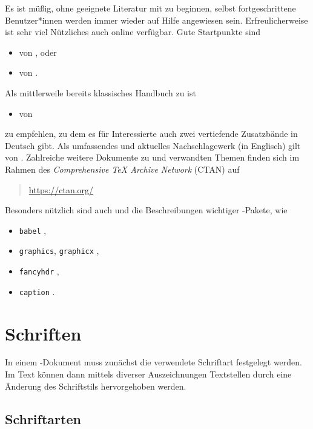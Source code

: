 Es ist müßig, ohne geeignete Literatur mit \latex zu beginnen, selbst
fortgeschrittene Benutzer*innen werden immer wieder auf Hilfe angewiesen
sein. Erfreulicherweise ist sehr viel Nützliches auch online verfügbar.
Gute Startpunkte sind \zB
%
\begin{itemize}
	\item {} von \textcite{Daniel2018}, oder
    \item {} von \textcite{Oetiker2021}.
\end{itemize}
%
\noindent
Als mittlerweile bereits klassisches Handbuch zu \latex ist
%
\begin{itemize}
    \item {} von \textcite{Kopka2003}
\end{itemize}
%
zu empfehlen, zu dem es für Interessierte auch zwei vertiefende Zusatzbände
in Deutsch gibt. Als umfassendes und aktuelles Nachschlagewerk (in Englisch)
gilt  von \textcite{Mittelbach2023}. Zahlreiche
weitere Dokumente zu \latex und verwandten Themen
finden sich \ua im Rahmen des {\em Comprehensive TeX Archive Network} (CTAN) auf
%
\begin{quote}
    \url{https://ctan.org/}
\end{quote}
%
Besonders nützlich sind auch  \cite{Pakin2026} und die
Beschreibungen wichtiger \latex-Pakete, wie
%
\begin{itemize}
    \item[] \texttt{babel} \cite{Bezos2026},
    \item[] \texttt{graphics}, \texttt{graphicx} \cite{Carlisle2026},
    \item[] \texttt{fancyhdr} \cite{Oostrum2025},
    \item[] \texttt{caption} \cite{Sommerfeldt2023}.
\end{itemize}


\section{Schriften}

In einem \latex-Dokument muss zunächst die verwendete Schriftart festgelegt
werden. Im Text können dann mittels diverser Auszeichnungen Textstellen durch
eine Änderung des Schriftstils hervorgehoben werden.

\subsection{Schriftarten}
\label{sec:Schriftarten}

